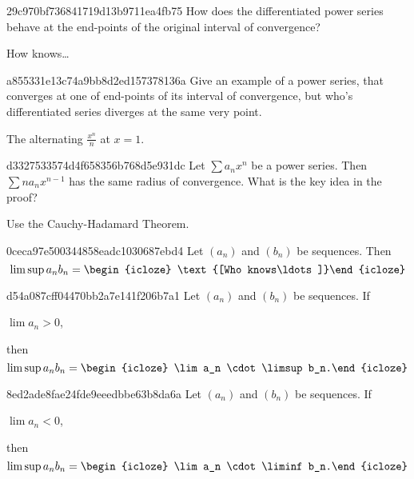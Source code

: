 \begin{note}{29c970bf736841719d13b9711ea4fb75}
    How does the dif\-fer\-en\-ti\-ated power series behave at the end-points of the original interval of convergence?

    \begin{cloze}{1}
        How knows\ldots
    \end{cloze}
\end{note}

\begin{note}{a855331e13c74a9bb8d2ed157378136a}
    Give an example of a power series, that converges at one of end-points of its interval of convergence, but who's dif\-fer\-en\-ti\-ated series diverges at the same very point.

    \begin{cloze}{1}
        The alternating \({ \frac{x^{n}}{n} }\) at \({ x = 1 }\).
    \end{cloze}
\end{note}

\begin{note}{d3327533574d4f658356b768d5e931dc}
    Let \({ \sum a_n x^{n} }\) be a power series.
    Then \({ \sum n a_n x^{n-1} }\) has the same radius of convergence.
    What is the key idea in the proof?

    \begin{cloze}{1}
        Use the Cauchy-Hadamard Theorem.
    \end{cloze}
\end{note}

\begin{note}{0ceca97e500344858eadc1030687ebd4}
    Let \({ (a_n) }\) and \({ (b_n) }\) be sequences.
    Then
    \[
        \limsup a_n b_n = \begin{icloze}{1}\text{[Who knows\ldots]}\end{icloze}
    \]
\end{note}

\begin{note}{d54a087cff04470bb2a7e141f206b7a1}
    Let \({ (a_n) }\) and \({ (b_n) }\) be sequences.
    If \begin{icloze}{2}\({ \lim a_n > 0 }\),\end{icloze} then
    \[
        \limsup a_n b_n = \begin{icloze}{1}\lim a_n \cdot \limsup b_n.\end{icloze}
    \]
\end{note}

\begin{note}{8ed2ade8fae24fde9eeedbbe63b8da6a}
    Let \({ (a_n) }\) and \({ (b_n) }\) be sequences.
    If \begin{icloze}{2}\({ \lim a_n < 0 }\),\end{icloze} then
    \[
        \limsup a_n b_n = \begin{icloze}{1}\lim a_n \cdot \liminf b_n.\end{icloze}
    \]
\end{note}

